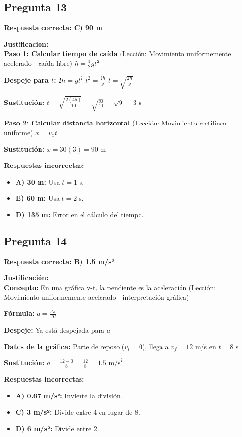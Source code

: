\begin{respuestabox}
\subsection{Pregunta 13}
\textcolor{verdecorrecto}{\textbf{Respuesta correcta: C) 90 m}}

\textbf{Justificación:}\\
\textbf{Paso 1: Calcular tiempo de caída} (Lección: Movimiento uniformemente acelerado - caída libre)
$h = \frac{1}{2}gt^2$

\textbf{Despeje para $t$:}
$2h = gt^2$
$t^2 = \frac{2h}{g}$
$t = \sqrt{\frac{2h}{g}}$

\textbf{Sustitución:}
$t = \sqrt{\frac{2(45)}{10}} = \sqrt{\frac{90}{10}} = \sqrt{9} = 3 \text{ s}$

\textbf{Paso 2: Calcular distancia horizontal} (Lección: Movimiento rectilíneo uniforme)
$x = v_x t$

\textbf{Sustitución:}
$x = 30(3) = 90 \text{ m}$

\textbf{Respuestas incorrectas:}
\begin{itemize}
    \item \textbf{A) 30 m:} Usa $t = 1$ s.
    \item \textbf{B) 60 m:} Usa $t = 2$ s.
    \item \textbf{D) 135 m:} Error en el cálculo del tiempo.
\end{itemize}
\end{respuestabox}


\begin{respuestabox}
\subsection{Pregunta 14}
\textcolor{verdecorrecto}{\textbf{Respuesta correcta: B) 1.5 m/s²}}

\textbf{Justificación:}\\
\textbf{Concepto:} En una gráfica v-t, la pendiente es la aceleración (Lección: Movimiento uniformemente acelerado - interpretación gráfica)

\textbf{Fórmula:}
$a = \frac{\Delta v}{\Delta t}$

\textbf{Despeje:} Ya está despejada para $a$

\textbf{Datos de la gráfica:} Parte de reposo ($v_i = 0$), llega a $v_f = 12$ m/s en $t = 8$ s

\textbf{Sustitución:}
$a = \frac{12 - 0}{8} = \frac{12}{8} = 1.5 \text{ m/s}^2$

\textbf{Respuestas incorrectas:}
\begin{itemize}
    \item \textbf{A) 0.67 m/s²:} Invierte la división.
    \item \textbf{C) 3 m/s²:} Divide entre 4 en lugar de 8.
    \item \textbf{D) 6 m/s²:} Divide entre 2.
\end{itemize}
\end{respuestabox}

